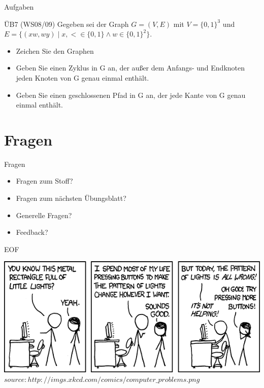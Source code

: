 	
	
	\begin{frame}{Aufgaben}
		\begin{block} {ÜB7 (WS08/09)}
			Gegeben sei der Graph $G = (V,E)$ mit $V = \{0,1\}^3$ und $E = \{(xw, wy)\;|\;x,< \in \{0,1\} \land w \in \{0,1\}^2\}$.
			
			\begin{itemize}
				\item Zeichen Sie den Graphen
				\item Geben Sie einen Zyklus in G an, der außer dem 
					Anfangs- und Endknoten jeden Knoten von G genau einmal enthält.
				\item Geben Sie einen geschlossenen Pfad in G an, 
					der jede Kante von G genau einmal enthält.
			\end{itemize}
		\end{block}
	\end{frame}
	
	
	
	
	\section{Fragen}
	\begin{frame} {Fragen}
		\begin{itemize}
			\item Fragen zum Stoff?
			\item Fragen zum n\"achsten \"Ubungsblatt?
			\item Generelle Fragen?
			\item Feedback?
		\end{itemize}
	\end{frame}

		
	\begin{frame} {EOF}
		\begin{center}
			\includegraphics[scale=0.6]{graphics/eof7.png}\\
			\tiny $source: http://imgs.xkcd.com/comics/computer\_problems.png$
		\end{center}
	\end{frame}


